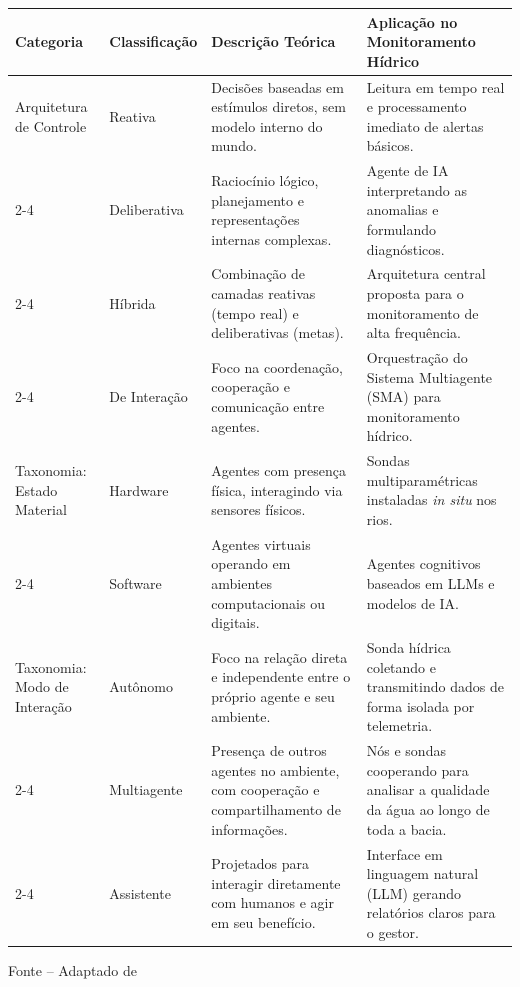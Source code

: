 \begin{quadro}[htb]
\centering
\caption{Paradigmas de agentes segundo Müller (1999) e sua aplicação no sistema proposto}
\label{qua:muller_agentes}
\small
\begin{tabular}{|p{2.8cm}|p{2.8cm}|p{5.2cm}|p{4.2cm}|}
\hline
\textbf{Categoria} & 
\textbf{Classificação} & 
\textbf{Descrição Teórica} & 
\textbf{Aplicação no \newline Monitoramento Hídrico} \\ \hline

Arquitetura de \newline Controle & 
Reativa & 
Decisões baseadas em estímulos diretos, 
sem modelo interno do mundo. & 
Leitura em tempo real e processamento 
imediato de alertas básicos. \\ \cline{2-4}

& 
Deliberativa & 
Raciocínio lógico, planejamento e representações 
internas complexas. & 
Agente de IA interpretando as anomalias 
e formulando diagnósticos. \\ \cline{2-4}

& 
Híbrida & 
Combinação de camadas reativas (tempo real) 
e deliberativas (metas). & 
Arquitetura central proposta para o monitoramento 
de alta frequência. \\ \cline{2-4}

& 
De Interação & 
Foco na coordenação, cooperação e comunicação 
entre agentes. & 
Orquestração do Sistema Multiagente (SMA) 
para monitoramento hídrico. \\ \hline

Taxonomia: \newline Estado Material & 
Hardware & 
Agentes com presença física, interagindo 
via sensores físicos. & 
Sondas multiparamétricas instaladas 
\textit{in situ} nos rios. \\ \cline{2-4}

& 
Software & 
Agentes virtuais operando em ambientes 
computacionais ou digitais. & 
Agentes cognitivos baseados em LLMs 
e modelos de IA. \\ \hline

Taxonomia: \newline Modo de Interação & 
Autônomo & 
Foco na relação direta e independente entre o 
próprio agente e seu ambiente. & 
Sonda hídrica coletando e transmitindo dados 
de forma isolada por telemetria. \\ \cline{2-4}

& 
Multiagente & 
Presença de outros agentes no ambiente, com 
cooperação e compartilhamento de informações. & 
Nós e sondas cooperando para analisar a 
qualidade da água ao longo de toda a bacia. \\ \cline{2-4}

& 
Assistente & 
Projetados para interagir diretamente com 
humanos e agir em seu benefício. & 
Interface em linguagem natural (LLM) gerando 
relatórios claros para o gestor. \\ \hline
\end{tabular}

\vspace{0.1cm}
{\footnotesize Fonte – Adaptado de }
\end{quadro}
